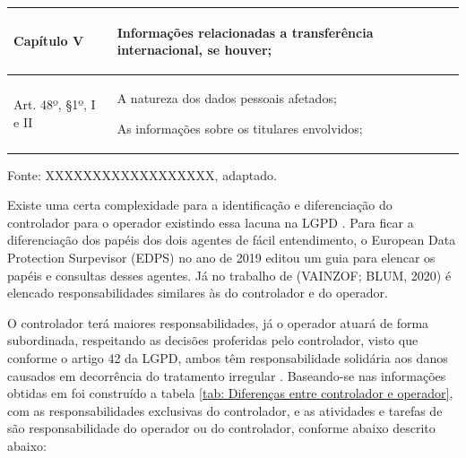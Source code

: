 \documentclass[
	12pt,				%
	openright,			%
	oneside,			%
	a4paper,			%
	english,			%
	french,				%
	spanish,			%
	brazil,				%
	]{abntex2}
\begin{document}
\begin{table}[ht]
\begin{tabular}{|p{4 cm}|p{11.5cm}|p{0cm}|}
Capítulo V
&
\begin{tabitemize}
\item Informações relacionadas a transferência internacional, se houver;
\end{tabitemize}\\ \hline

Art. 48º, §1º, I e II
&
\begin{tabitemize}
\item A natureza dos dados pessoais afetados;
\item As informações sobre os titulares envolvidos;
\end{tabitemize}\\ \hline

 
    \end{tabular}
    \newline \newline Fonte: XXXXXXXXXXXXXXXXXX, adaptado.
\end{table}

Existe uma certa complexidade para a identificação e diferenciação do controlador para o operador existindo essa lacuna na LGPD \cite{Alves2020}. Para ficar a diferenciação dos papéis dos dois agentes de fácil entendimento, o European Data Protection Surpevisor (EDPS) no ano de 2019 editou um guia para elencar os papéis e consultas desses agentes. Já no trabalho de (VAINZOF; BLUM, 2020) é elencado responsabilidades similares às do controlador e do operador.

O controlador terá maiores responsabilidades, já o operador atuará de forma subordinada, respeitando as decisões proferidas pelo controlador, visto que conforme o artigo 42 da LGPD, ambos têm responsabilidade solidária aos danos causados em decorrência do tratamento irregular \cite{01-01-LeiGeral}.  Baseando-se nas informações obtidas em \cite{Alves2020}  foi construído a tabela \ref{tab: Diferenças entre controlador e operador}, com as responsabilidades exclusivas do controlador, e as atividades e tarefas de são responsabilidade do operador ou do controlador, conforme abaixo descrito  abaixo:
\end{document}
